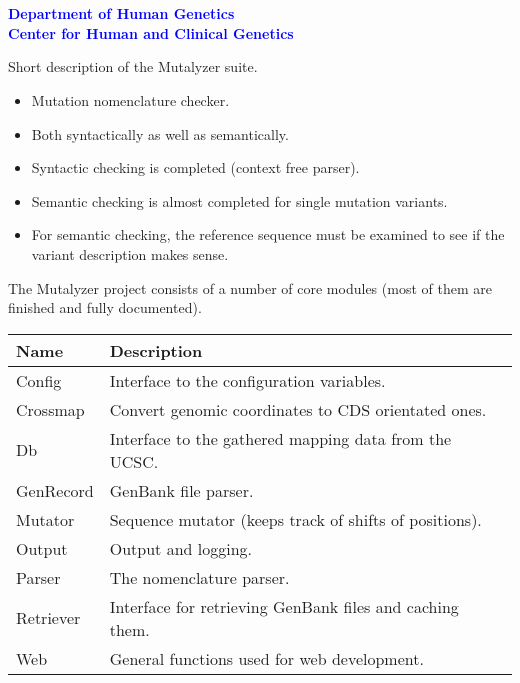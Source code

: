\documentclass[a4, portrait]{seminar}
\begin{document}

\begin{slide}
\setcounter{slide}{0}
\vspace*{1.5cm}
\begin{center}
{\bf\Large{\myTitle}}\\
\vfill
\textcolor{Blue}{
  {\bf
    \small{\me}\\
    \small{Department of Human Genetics}\\
    \small{Center for Human and Clinical Genetics}
  }
}
\vspace{1.1cm}
\end{center}
\end{slide}



\begin{slide}
Short description of the Mutalyzer suite.
\vspace{1cm}
\begin{itemize}
\item Mutation nomenclature checker.
\item Both syntactically as well as semantically.
\item Syntactic checking is completed (context free parser).
\item Semantic checking is almost completed for single mutation variants.
\item For semantic checking, the reference sequence must be examined to see if
     the variant description makes sense.
\end{itemize}
\vfill
\end{slide}

\begin{slide}
The Mutalyzer project consists of a number of core modules (most of them are
finished and fully documented).

\begin{tabular}{l|l}
Name      & Description\\
\hline
Config    & Interface to the configuration variables.\\
Crossmap  & Convert genomic coordinates to CDS orientated ones.\\
Db        & Interface to the gathered mapping data from the UCSC.\\
GenRecord & GenBank file parser.\\
Mutator   & Sequence mutator (keeps track of shifts of positions).\\
Output    & Output and logging.\\
Parser    & The nomenclature parser.\\
Retriever & Interface for retrieving GenBank files and caching them.\\
Web       & General functions used for web development.\\
\end{tabular}
\vfill
\end{slide}
\end{document}
